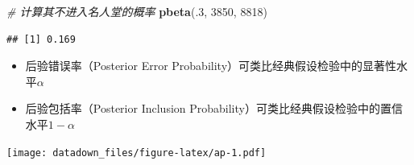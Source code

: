 \documentclass[]{book}
\newenvironment{Shaded}{\begin{snugshade}}{\end{snugshade}}
\newcommand{\CommentTok}[1]{\textcolor[rgb]{0.56,0.35,0.01}{\textit{#1}}}
\newcommand{\DataTypeTok}[1]{\textcolor[rgb]{0.13,0.29,0.53}{#1}}
\newcommand{\DecValTok}[1]{\textcolor[rgb]{0.00,0.00,0.81}{#1}}
\newcommand{\FloatTok}[1]{\textcolor[rgb]{0.00,0.00,0.81}{#1}}
\newcommand{\KeywordTok}[1]{\textcolor[rgb]{0.13,0.29,0.53}{\textbf{#1}}}
\newcommand{\NormalTok}[1]{#1}
\newcommand{\OperatorTok}[1]{\textcolor[rgb]{0.81,0.36,0.00}{\textbf{#1}}}
\newcommand{\StringTok}[1]{\textcolor[rgb]{0.31,0.60,0.02}{#1}}
\begin{document}
\begin{Shaded}
\begin{Highlighting}[]
\CommentTok{# 计算其不进入名人堂的概率}
\KeywordTok{pbeta}\NormalTok{(.}\DecValTok{3}\NormalTok{, }\DecValTok{3850}\NormalTok{, }\DecValTok{8818}\NormalTok{)}
\end{Highlighting}
\end{Shaded}

\begin{verbatim}
## [1] 0.169
\end{verbatim}

\begin{itemize}
\item
  后验错误率（Posterior Error Probability）可类比经典假设检验中的显著性水平\(\alpha\)
\item
  后验包括率（Posterior Inclusion Probability）可类比经典假设检验中的置信水平\(1-\alpha\)
\end{itemize}

\begin{Shaded}
\end{Shaded}

\texttt{[image: datadown\_files/figure-latex/ap-1.pdf]}
\end{document}
